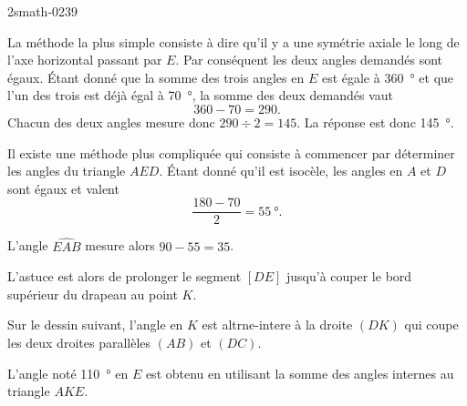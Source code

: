 
\begin{corrige}{2smath-0239}

    La méthode la plus simple consiste à dire qu'il y a une symétrie axiale le long de l'axe horizontal passant par \( E\). Par conséquent les deux angles demandés sont égaux. Étant donné que la somme des trois angles en \( E\) est égale à \SI{360}{\degree} et que l'un des trois est déjà égal à \SI{70}{\degree}, la somme des deux demandés vaut
    \begin{equation}
        360-70=290.
    \end{equation}
    Chacun des deux angles mesure donc \( 290\div 2=145\). La réponse est donc \SI{145}{\degree}.

    Il existe une méthode plus compliquée qui consiste à commencer par déterminer les angles du triangle \( AED\). Étant donné qu'il est isocèle, les angles en \( A\) et \( D\) sont égaux et valent
    \begin{equation}
        \frac{ 180-70 }{ 2 }=\SI{55}{\degree}.
    \end{equation}
    
    L'angle \( \widehat{EAB}\) mesure alors \( 90-55=35\).

    L'astuce est alors de prolonger le segment \( [DE]\) jusqu'à couper le bord supérieur du drapeau au point \( K\).

    Sur le dessin suivant, l'angle en \( K\) est altrne-intere à la droite \( (DK)\) qui coupe les deux droites parallèles \( (AB)\) et \( (DC)\).
    \begin{center}
        \small

    \end{center}
    L'angle noté \SI{110}{\degree} en \( E\) est obtenu en utilisant la somme des angles internes au triangle \( AKE\).


\end{corrige}
